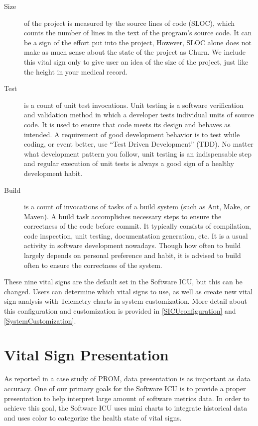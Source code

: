 \begin{description}
\item[Size] 
 of the project is measured by the source lines of code (SLOC), which counts the number of lines in the text of the program's source code. It can be a sign of the effort put into the project, However, SLOC alone does not make as much sense about the state of the project as Churn. We include this vital sign only to give user an idea of the size of the project, just like the height in your medical record.

\item[Test] 
is a count of unit test invocations. Unit testing is a software verification and validation method in which a developer tests individual units of source code. It is used to ensure that code meets its design and behaves as intended. A requirement of good development behavior is to test while coding, or event better, use ``Test Driven Development'' (TDD). No matter what development pattern you follow, unit testing is an indispensable step and regular execution of unit tests is always a good sign of a healthy development habit.

\item[Build] 
is a count of invocations of tasks of a build system (such as Ant, Make, or Maven). A build task accomplishes necessary steps to ensure the correctness of the code before commit. It typically consists of compilation, code inspection, unit testing, documentation generation, etc. It is a usual activity in software development nowadays. Though how often to build largely depends on personal preference and habit, it is advised to build often to ensure the correctness of the system.

\end{description}

These nine vital signs are the default set in the Software ICU, but this can be changed. Users can determine which vital signs to use, as well as create new vital sign analysis with Telemetry charts in system customization. More detail about this configuration and customization is provided in \autoref{SICUconfiguration} and \autoref{SystemCustomization}.

\section{Vital Sign Presentation}
\label{presentation}
As reported in a case study of PROM, data presentation is as important as data accuracy\cite{prom09}. One of our primary goals for the Software ICU is to provide a proper presentation to help interpret large amount of software metrics data. In order to achieve this goal, the Software ICU uses mini charts to integrate historical data and uses color to categorize the health state of vital signs.

